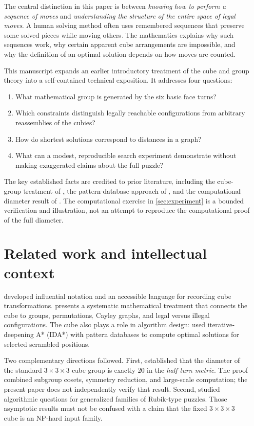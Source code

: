 \documentclass[11pt,a4paper]{article}
\theoremstyle{definition}
\theoremstyle{remark}
\begin{document}
The central distinction in this paper is between \emph{knowing how to perform a sequence of moves} and \emph{understanding the structure of the entire space of legal moves}. A human solving method often uses remembered sequences that preserve some solved pieces while moving others. The mathematics explains why such sequences work, why certain apparent cube arrangements are impossible, and why the definition of an optimal solution depends on how moves are counted.

This manuscript expands an earlier introductory treatment of the cube and group theory into a self-contained technical exposition. It addresses four questions:
\begin{enumerate}[leftmargin=*,itemsep=3pt]
\item What mathematical group is generated by the six basic face turns?
\item Which constraints distinguish legally reachable configurations from arbitrary reassemblies of the cubies?
\item How do shortest solutions correspond to distances in a graph?
\item What can a modest, reproducible search experiment demonstrate without making exaggerated claims about the full puzzle?
\end{enumerate}

The key established facts are credited to prior literature, including the cube-group treatment of \citet{joyner2008}, the pattern-database approach of \citet{korf1997}, and the computational diameter result of \citet{rokicki2013}. The computational exercise in \cref{sec:experiment} is a bounded verification and illustration, not an attempt to reproduce the computational proof of the full diameter.

\section{Related work and intellectual context}
\citet{singmaster1981} developed influential notation and an accessible language for recording cube transformations. \citet{joyner2008} presents a systematic mathematical treatment that connects the cube to groups, permutations, Cayley graphs, and legal versus illegal configurations. The cube also plays a role in algorithm design: \citet{korf1997} used iterative-deepening A* (IDA*) with pattern databases to compute optimal solutions for selected scrambled positions.

Two complementary directions followed. First, \citet{rokicki2013} established that the diameter of the standard $3\times3\times3$ cube group is exactly $20$ in the \emph{half-turn metric}. The proof combined subgroup cosets, symmetry reduction, and large-scale computation; the present paper does not independently verify that result. Second, \citet{demaine2011} studied algorithmic questions for generalized families of Rubik-type puzzles. Those asymptotic results must not be confused with a claim that the fixed $3\times3\times3$ cube is an NP-hard input family.
\end{document}
